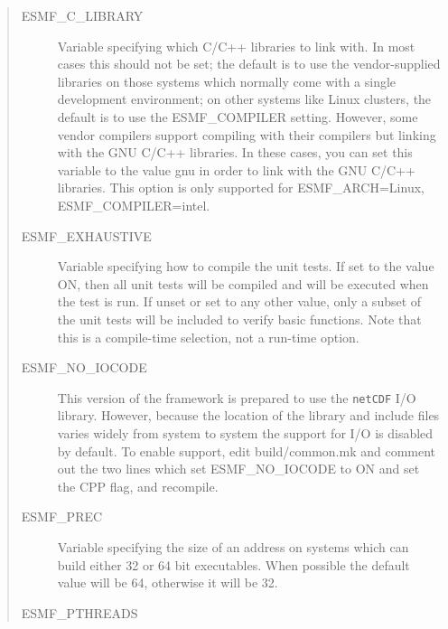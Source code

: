 \begin{quote}
\begin{description}
\item[ESMF\_C\_LIBRARY]

Variable specifying which C/C++ libraries to link with.  In most cases
this should not be set; the default is to use the vendor-supplied
libraries on those systems which normally come with a single
development environment; on other systems like Linux clusters,
the default is to use the ESMF\_COMPILER setting.  However, some
vendor compilers support compiling with their compilers but linking
with the GNU C/C++ libraries.
In these cases, you can set this variable
to the value gnu in order to link with the GNU C/C++ libraries.
This option is only supported for ESMF\_ARCH=Linux, ESMF\_COMPILER=intel.


  \item[ESMF\_EXHAUSTIVE] Variable specifying how to compile the unit tests.
                 If set to the value ON, then all unit tests will be compiled
                 and will be executed when the test is run.  If unset or set 
                 to any other value, only a subset of the unit tests will 
                 be included to verify basic functions.  Note that this
                 is a compile-time selection, not a run-time option.

  \item[ESMF\_NO\_IOCODE] This version of the framework is prepared to use
                 the {\tt netCDF} I/O library.  However, because the location
                 of the library and include files varies widely from 
                 system to system the support for I/O is disabled by default.
                 To enable support, edit build/common.mk and comment out the 
                 two lines which set ESMF\_NO\_IOCODE to ON and set the 
                 CPP flag,
                 and recompile.

  \item[ESMF\_PREC] Variable specifying the size of an address on systems
                 which can build either 32 or 64 bit executables.
                 When possible the default value will be 64, otherwise 
                 it will be 32.

\item[ESMF\_PTHREADS]


\end{description}
\end{quote}
